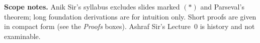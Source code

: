 \documentclass[11pt,a4paper,openany]{book}
\begin{document}
\medskip
\textbf{Scope notes.} Anik Sir's syllabus excludes slides marked $(*)$ and Parseval's theorem; long foundation derivations are for intuition only. Short proofs are given in compact form (see the \emph{Proofs} boxes). Ashraf Sir's Lecture~0 is history and not examinable.

\tableofcontents

\mainmatter





\end{document}
